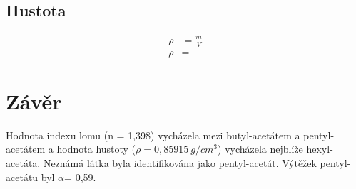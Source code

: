 \documentclass[13pt, a4paper, twoside]{article}
\begin{document}
\subsection*{Hustota}
\begin{align*}
    \rho &= \frac{m}{V}\\
    \rho &= 
\end{align*}

\section*{Závěr}
Hodnota indexu lomu (n = 1,398) vycházela mezi butyl-acetátem a pentyl-acetátem a hodnota hustoty ($\rho = 0,85915\: g/cm^3$) vycházela nejblíže hexyl-acetáta. Neznámá látka byla identifikována jako pentyl-acetát. Výtěžek pentyl-acetátu byl $\alpha$= 0,59.
\end{document}
